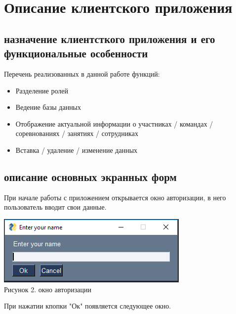 \documentclass[a4paper,12pt,preview]{report} %
\begin{document}
	\chapter{Описание клиентского приложения}
	
	\section{назначение клиентсткого приложения и его функциональные особенности}
	
	Перечень реализованных в данной работе функций:
	\begin{itemize}
		\item Разделение ролей
		\item Ведение базы данных
		\item Отображение актуальной информации о участниках / командах / соревнованиях / занятиях / сотрудниках
		\item Вставка / удаление / изменение данных
	\end{itemize}
	
	\section{описание основных экранных форм}
	
	При начале работы с приложением открывается окно авторизации, в него пользователь вводит свои данные.
	
	\begin{center}
		\includegraphics{autorization.PNG} \\
		Рисунок 2. окно авторизации
	\end{center}
	
	При нажатии кпопки "Ок" появляется следующее окно.
	
\end{document}
